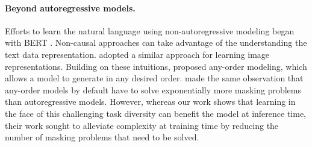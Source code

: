 \paragraph{Beyond autoregressive models.}
Efforts to learn the natural language using non-autoregressive modeling began with BERT \cite{devlin-etal-2019-bert}. Non-causal approaches can take advantage of the understanding the text data representation. \cite{chang2022maskgit} adopted a similar approach for learning image representations. Building on these intuitions, 
\cite{shih2022training,hoogeboom2022autoregressive} proposed any-order modeling, which allows a model to generate in any desired order. \citet{shih2022training} made the same observation that any-order models by default have to solve exponentially more masking problems than autoregressive models. However, whereas our work shows that learning in the face of this challenging task diversity can benefit the model at inference time, their work sought to alleviate complexity at training time by reducing the number of masking problems that need to be solved.